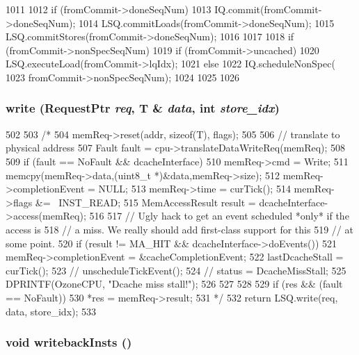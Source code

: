 \begin{DoxyCode}
1011 {
1012     if (fromCommit->doneSeqNum) {
1013         IQ.commit(fromCommit->doneSeqNum);
1014         LSQ.commitLoads(fromCommit->doneSeqNum);
1015         LSQ.commitStores(fromCommit->doneSeqNum);
1016     }
1017 
1018     if (fromCommit->nonSpecSeqNum) {
1019         if (fromCommit->uncached) {
1020             LSQ.executeLoad(fromCommit->lqIdx);
1021         } else {
1022             IQ.scheduleNonSpec(
1023                 fromCommit->nonSpecSeqNum);
1024         }
1025     }
1026 }
\end{DoxyCode}
\hypertarget{classBackEnd_abbf7bcc93511421a1787650a43e2642a}{
\subsubsection[{write}]{ write ({\bf RequestPtr} {\em req}, \/  T \& {\em data}, \/  int {\em store\_\-idx})}}
\label{classBackEnd_abbf7bcc93511421a1787650a43e2642a}



\begin{DoxyCode}
502 {
503 /*
504     memReq->reset(addr, sizeof(T), flags);
505 
506     // translate to physical address
507     Fault fault = cpu->translateDataWriteReq(memReq);
508 
509     if (fault == NoFault && dcacheInterface) {
510         memReq->cmd = Write;
511         memcpy(memReq->data,(uint8_t *)&data,memReq->size);
512         memReq->completionEvent = NULL;
513         memReq->time = curTick();
514         memReq->flags &= ~INST_READ;
515         MemAccessResult result = dcacheInterface->access(memReq);
516 
517         // Ugly hack to get an event scheduled *only* if the access is
518         // a miss.  We really should add first-class support for this
519         // at some point.
520         if (result != MA_HIT && dcacheInterface->doEvents()) {
521             memReq->completionEvent = &cacheCompletionEvent;
522             lastDcacheStall = curTick();
523 //          unscheduleTickEvent();
524 //          status = DcacheMissStall;
525             DPRINTF(OzoneCPU, "Dcache miss stall!\n");
526         }
527     }
528 
529     if (res && (fault == NoFault))
530         *res = memReq->result;
531         */
532     return LSQ.write(req, data, store_idx);
533 }
\end{DoxyCode}
\hypertarget{classBackEnd_a5e9a203f943b3a8a243ddc6d2a0a240d}{
\subsubsection[{writebackInsts}]{\setlength{\rightskip}{0pt plus 5cm}void writebackInsts ()}}
\label{classBackEnd_a5e9a203f943b3a8a243ddc6d2a0a240d}



